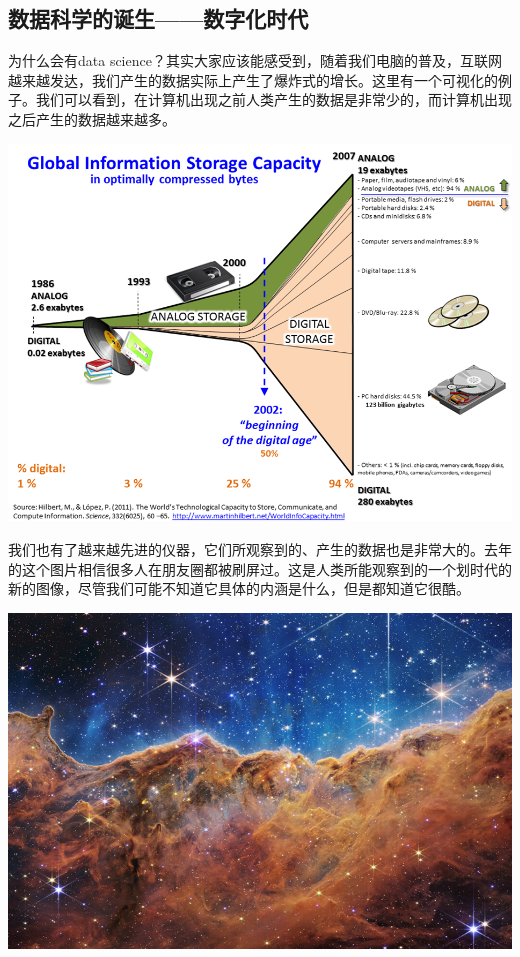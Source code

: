 \documentclass[
  oneside]{book}
\begin{document}
\hypertarget{1-data-science-born}{%
\subsection{数据科学的诞生------数字化时代}\label{1-data-science-born}}

为什么会有data
science？其实大家应该能感受到，随着我们电脑的普及，互联网越来越发达，我们产生的数据实际上产生了爆炸式的增长。这里有一个可视化的例子。我们可以看到，在计算机出现之前人类产生的数据是非常少的，而计算机出现之后产生的数据越来越多。

\includegraphics{1001-lesson1/image-20230302194802453.png}

我们也有了越来越先进的仪器，它们所观察到的、产生的数据也是非常大的。去年的这个图片相信很多人在朋友圈都被刷屏过。这是人类所能观察到的一个划时代的新的图像，尽管我们可能不知道它具体的内涵是什么，但是都知道它很酷。

\includegraphics{1001-lesson1/image-20230302194916461.png}
\end{document}
